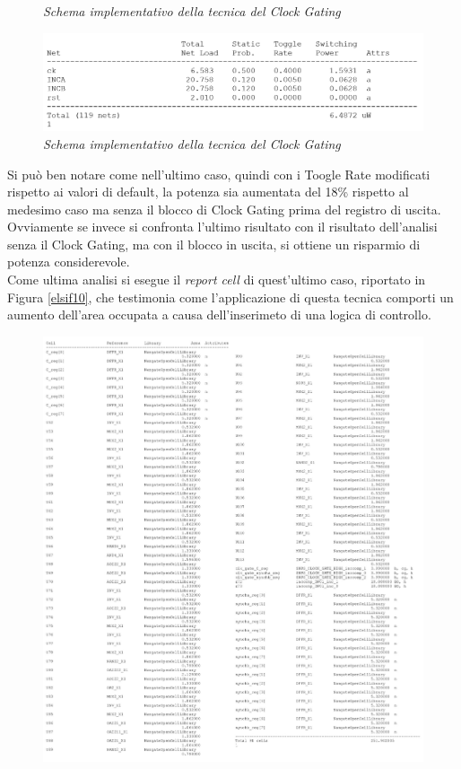 {\begin{figure}[!htb]
	\caption{\textit{Schema implementativo della tecnica del Clock Gating}}
	\label{elsif8}
\end{figure}
\begin{figure}[!htb]
	\centering
	\includegraphics[scale=0.65]{immagini/elsif9}
	\caption{\textit{Schema implementativo della tecnica del Clock Gating}}
	\label{elsif9}
\end{figure}
\newpage
\noindent Si può ben notare come nell'ultimo caso, quindi con i Toogle Rate modificati rispetto ai valori di default, la potenza sia aumentata del 18\% rispetto al medesimo caso ma senza il blocco di Clock Gating prima del registro di uscita. Ovviamente se invece si confronta l'ultimo risultato con il risultato dell'analisi senza il Clock Gating, ma con il blocco in uscita, si ottiene un risparmio di potenza considerevole.\\
Come ultima analisi si esegue il \textit{report cell} di quest'ultimo caso, riportato in Figura \ref{elsif10}, che testimonia come l'applicazione di questa tecnica comporti un aumento dell'area occupata a causa dell'inserimeto di una logica di controllo.
\begin{figure}[!htb]
	\centering
	\includegraphics[scale=0.28]{immagini/elsif10}

\end{figure}}
